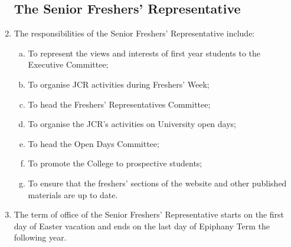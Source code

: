 \documentclass[12pt]{article}
\begin{document}
\begin{enumerate}
    \subsection{The Senior Freshers’ Representative}
    \item The responsibilities of the Senior Freshers' Representative include:
    \begin{enumerate}[(a)]
        \item To represent the views and interests of first year students to the Executive Committee;
        \item To organise JCR activities during Freshers’ Week;
        \item To head the Freshers’ Representatives Committee;
        \item To organise the JCR’s activities on University open days;
        \item To head the Open Days Committee;
        \item To promote the College to prospective students;
        \item To ensure that the freshers’ sections of the website and other published materials are up to date.
    \end{enumerate}
    \item The term of office of the Senior Freshers' Representative starts on the first day of Easter vacation and ends on the last day of Epiphany Term the following year.

\end{enumerate}
\end{document}
